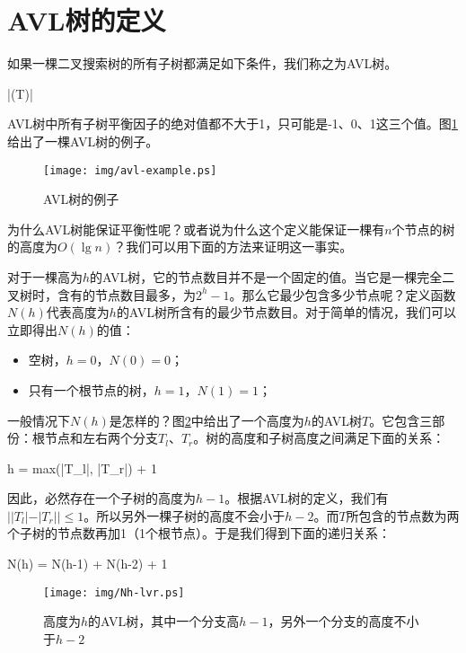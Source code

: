 \documentclass[UTF8]{article}
\begin{document}
\section{AVL树的定义}

如果一棵二叉搜索树的所有子树都满足如下条件，我们称之为AVL树。

\be
  |\delta(T)| 
\ee

AVL树中所有子树平衡因子的绝对值都不大于1，只可能是-1、0、1这三个值。图\ref{fig:avl-example}给出了一棵AVL树的例子。

\begin{figure}[htbp]
   \centering
   \texttt{[image: img/avl-example.ps]}
   \caption{AVL树的例子} \label{fig:avl-example}
\end{figure}

为什么AVL树能保证平衡性呢？或者说为什么这个定义能保证一棵有$n$个节点的树的高度为$O(\lg n)$？我们可以用下面的方法来证明这一事实。

对于一棵高为$h$的AVL树，它的节点数目并不是一个固定的值。当它是一棵完全二叉树时，含有的节点数目最多，为$2^h-1$。那么它最少包含多少节点呢？定义函数$N(h)$代表高度为$h$的AVL树所含有的最少节点数目。对于简单的情况，我们可以立即得出$N(h)$的值：

\begin{itemize}
\item 空树，$h=0$，$N(0)=0$；
\item 只有一个根节点的树，$h=1$，$N(1)=1$；
\end{itemize}

一般情况下$N(h)$是怎样的？图\ref{fig:N-h-relation}中给出了一个高度为$h$的AVL树$T$。它包含三部份：根节点和左右两个分支$T_l$、$T_r$。树的高度和子树高度之间满足下面的关系：

\be
  h = max(|T_l|, |T_r|) + 1
\ee

因此，必然存在一个子树的高度为$h-1$。根据AVL树的定义，我们有 $||T_l| -|T_r|| \leq 1$。所以另外一棵子树的高度不会小于$h-2$。而$T$所包含的节点数为两个子树的节点数再加1（1个根节点）。于是我们得到下面的递归关系：

\be
  N(h) = N(h-1) + N(h-2) + 1
  \label{eq:Fibonacci-like}
\ee

\begin{figure}[htbp]
   \centering
   \texttt{[image: img/Nh-lvr.ps]}
   \caption{高度为$h$的AVL树，其中一个分支高$h-1$，另外一个分支的高度不小于$h-2$} \label{fig:N-h-relation}
\end{figure}
\end{document}
